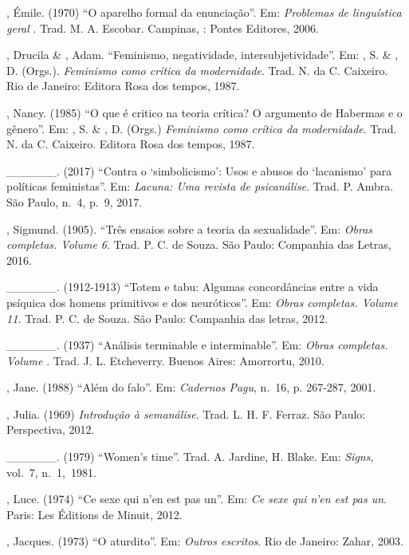 \begin{Parskip}
, Émile. (1970) ``O aparelho formal da enunciação''. Em:
\emph{Problemas de linguística geral }. Trad. M. A. Escobar. Campinas, :
Pontes Editores, 2006.

, Drucila \& , Adam. ``Feminismo, negatividade,
intersubjetividade''. Em: , S. \& , D. (Orgs.).
\emph{Feminismo como crítica da modernidade}. Trad. N. da C. Caixeiro.
Rio de Janeiro: Editora Rosa dos tempos, 1987.

, Nancy. (1985) ``O que é critico na teoria crítica? O argumento
de Habermas e o gênero''. Em: , S. \& , D. (Orgs.)
\emph{Feminismo como crítica da modernidade}. Trad. N. da C. Caixeiro.
Editora Rosa dos tempos, 1987.

\_\_\_\_\_\_. (2017) ``Contra o `simbolicismo': Usos e abusos do
`lacanismo' para políticas feministas''. Em: \emph{Lacuna: Uma revista
de psicanálise}.  Trad. P. Ambra. São Paulo, n.~4, p.~9, 2017.

, Sigmund. (1905). ``Três ensaios sobre a teoria da sexualidade''.
Em: \emph{Obras completas. Volume 6}. Trad. P. C. de Souza. São Paulo: Companhia das Letras, 2016.

\_\_\_\_\_\_. (1912-1913) ``Totem e tabu: Algumas concordâncias entre
a vida psíquica dos homens primitivos e dos neuróticos''. Em:
\emph{Obras completas. Volume 11.} Trad. P. C. de Souza. São Paulo:
Companhia das letras, 2012.

\_\_\_\_\_\_. (1937) ``Análisis terminable e interminable''. Em:
\emph{Obras completas. Volume }. Trad. J. L. Etcheverry. Buenos
Aires: Amorrortu, 2010.

, Jane. (1988) ``Além do falo''. Em: \emph{Cadernos Pagu}, n.~16, p.
267-287, 2001.

, Julia. (1969) \emph{Introdução à semanálise}. Trad. L. H. F.
Ferraz. São Paulo: Perspectiva, 2012.

\_\_\_\_\_\_. (1979) ``Women's time''. Trad. A. Jardine, H. Blake. Em:
\emph{Signs}, vol.~7, n.~1,~1981.

, Luce. (1974) ``Ce sexe qui n'en est pas un''. Em: \emph{Ce
sexe qui n'en est pas un}. Paris: Les Éditions de Minuit, 2012.

, Jacques. (1973) ``O aturdito''. Em: \emph{Outros escritos}. Rio de
Janeiro: Zahar, 2003.


\end{Parskip}
